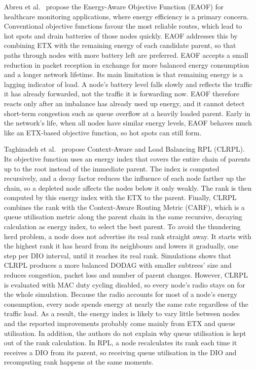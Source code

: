Abreu et al.~\cite{abreuEnergyawareRoutingBiomedical2014} propose the
Energy-Aware Objective Function (EAOF) for healthcare monitoring
applications, where energy efficiency is a primary concern. Conventional
objective functions favour the most reliable routes, which lead to
hot spots and drain batteries of those nodes quickly. EAOF addresses this by
combining ETX
with the remaining energy of each candidate parent, so that paths
through nodes with more battery left are preferred. EAOF accepts a
small reduction in packet reception in exchange for more balanced
energy consumption and a longer network lifetime. Its main limitation
is that remaining energy is a lagging indicator of load.
A node's battery level falls slowly and reflects the traffic it has already
forwarded, not the traffic it is forwarding now. EAOF therefore
reacts only after an imbalance has already used up energy, and it
cannot detect short-term congestion such as queue overflow at a
heavily loaded parent. Early in the network's life, when all nodes
have similar energy levels, EAOF behaves much like an ETX-based
objective function, so hot spots can still form.

Taghizadeh et al.~\cite{taghizadehCLRPLContextAwareLoad2018} propose
Context-Aware and Load Balancing RPL (CLRPL). Its objective function
uses an energy index that covers the entire chain of parents up to
the root instead of the immediate parent. The index is computed
recursively, and a decay factor reduces the influence of each node
farther up the chain, so a depleted node affects
the nodes below it only weakly. The rank is then computed by this
energy index with the ETX to the parent. Finally, CLRPL combines the
rank with the Context-Aware Routing Metric (CARF), which is a queue
utilisation metric along the parent chain in the same recursive,
decaying calculation as energy index,
to select the best parent.
To avoid the thundering herd problem, a node does not advertise its
real rank straight away. It starts with the highest rank it has heard
from its neighbours and lowers it gradually, one step per DIO
interval, until it reaches its real rank.
Simulations shows that CLRPL produces a more balanced DODAG with
smaller subtrees' size and reduces congestion, packet loss and
number of parent changes.
However, CLRPL is evaluated with MAC duty cycling disabled, so every
node's radio stays on for the whole simulation. Because the radio
accounts for most of a node's energy consumption, every node spends energy at
nearly the same rate regardless of the traffic load. As a result,
the energy index is likely to vary little between nodes and the
reported improvements probably come mainly from ETX and queue utilisation.
In addition, the authors do not explain why queue utilisation is kept
out of the rank calculation. In RPL, a node recalculates its rank each
time it receives a DIO from its parent, so receiving queue
utilisation in the DIO and recomputing rank happens at the same moments.

